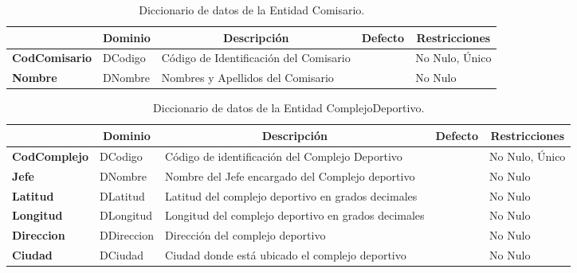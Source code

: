 \begin{table}[H]
\centering
\caption{Diccionario de datos de la Entidad Comisario.}
\label{tab-Dicc-12}
\begin{tabular}{>{\bfseries}m{4.0cm}>{}m{3.0cm}>{}m{6.0cm}>{}m{5.0cm}>{}m{2.0cm}}
\toprule
\multicolumn{1}{c}{\textbf{Atributo}} & \multicolumn{1}{c}{\textbf{Dominio}} & \multicolumn{1}{c}{\textbf{Descripción}} & \multicolumn{1}{c}{\textbf{Defecto}} & \multicolumn{1}{c}{\textbf{Restricciones}} \\ \midrule
CodComisario	&   DCodigo	&   Código de Identificación  del Comisario	&	&   No Nulo, Único  \\
Nombre	&   DNombre	&   Nombres y Apellidos del Comisario	&	&   No Nulo \\\bottomrule
\end{tabular}
\end{table}

\begin{table}[H]
\centering
\caption{Diccionario de datos de la Entidad ComplejoDeportivo.}
\label{tab-Dicc-13}
\begin{tabular}{>{\bfseries}m{4.0cm}>{}m{3.0cm}>{}m{6.0cm}>{}m{5.0cm}>{}m{2.0cm}}
\toprule
\multicolumn{1}{c}{\textbf{Atributo}} & \multicolumn{1}{c}{\textbf{Dominio}} & \multicolumn{1}{c}{\textbf{Descripción}} & \multicolumn{1}{c}{\textbf{Defecto}} & \multicolumn{1}{c}{\textbf{Restricciones}} \\ \midrule
CodComplejo	&	DCodigo	&	Código de identificación del Complejo Deportivo	&		&	No Nulo, Único\\
Jefe	&	DNombre	&	Nombre del Jefe encargado del Complejo deportivo	&		&	No Nulo\\
Latitud	&	DLatitud	&	Latitud del complejo deportivo en grados decimales	&		&	No Nulo\\
Longitud	&	DLongitud	&	Longitud del complejo deportivo en grados decimales	&		&	No Nulo\\
Direccion	&	DDireccion	&	Dirección del complejo deportivo	&		&	No Nulo\\
Ciudad	&	DCiudad	&	Ciudad donde está ubicado el complejo deportivo	&		&	No Nulo\\\bottomrule
\end{tabular}
\end{table}


